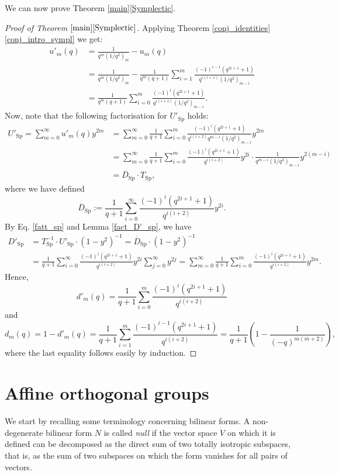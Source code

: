 \documentclass[a4paper, 12pt, oneside]{amsart}
\theoremstyle{definition}
\DeclareMathOperator{\Sp}{Sp}
\begin{document}
We can now prove Theorem \ref{main}\eqref{Symplectic}.
\begin{proof}[Proof of Theorem $\ref{main}\eqref{Symplectic}$]
Applying Theorem \ref{conj_identities}\eqref{conj_intro_sympl} we get:
\begin{align*}
u'_m(q)& =\frac{1}{q^m(1/q^2)_m}-u_m(q) \\
& =\frac{1}{q^m(1/q^2)_m}-\frac{1}{q^m(q+1)}\sum_{i=1}^{m}\frac{(-1)^{i-1}(q^{2i+1}+1)}{q^{i(i+1)}(1/q^2)_{m-i}}\\
& = \frac{1}{q^m(q+1)}\sum_{i=0}^{m}\frac{(-1)^{i}(q^{2i+1}+1)}{q^{i(i+1)}(1/q^2)_{m-i}}.
\end{align*}
Now, note that the following factorisation for $U'_{\Sp}$ holds:
\begin{align}
    \nonumber U'_{\Sp}=\sum_{m=0}^{\infty}u'_m(q)y^{2m}&=\sum_{m=0}^{\infty}\frac{1}{q+1}\sum_{i=0}^{m}
    \frac{(-1)^{i}(q^{2i+1}+1)}{q^{i(i+2)}q^{m-i}(1/q^2)_{m-i}}
    y^{2m}\\
    \nonumber &=\sum_{m=0}^{\infty}\frac{1}{q+1}\sum_{i=0}^{m}\frac{(-1)^i(q^{2i+1}+1)}{q^{i(i+2)}}y^{2i}\cdot\frac{1}{q^{m-i}(1/q^2)_{m-i}}y^{2(m-i)}\\
    \label{fatt_sp}
&=\overline{D}_{\Sp}\cdot T_{ \Sp},
\end{align}
where we have defined
$$\overline{D}_{\Sp}:=\frac{1}{q+1}\sum_{i=0}^{\infty}\frac{(-1)^i(q^{2i+1}+1)}{q^{i(i+2)}}y^{2i}.$$
By Eq. \eqref{fatt_sp} and Lemma \ref{fact_D'_sp}, we have 
\begin{align*}
D'_{\Sp}&=T^{-1}_{\Sp}\cdot U'_{\Sp} \cdot (1-y^2)^{-1}= \overline{D}_{\Sp} \cdot (1-y^2)^{-1} \\
&=\frac{1}{q+1}\sum_{i=0}^{\infty}\frac{(-1)^i(q^{2i+1}+1)}{q^{i(i+2)}}y^{2i}\sum_{j=0}^{\infty}y^{2j}=\sum_{m=0}^{\infty}\frac{1}{q+1}\sum_{i=0}^{m}\frac{(-1)^i(q^{2i+1}+1)}{q^{i(i+2)}}y^{2m}.
\end{align*}
Hence,
$$d'_m(q)=\frac{1}{q+1}\sum_{i=0}^{m}\frac{(-1)^i(q^{2i+1}+1)}{q^{i(i+2)}}$$
and
$$d_m(q)=1-d'_m(q)=\frac{1}{q+1}\sum_{i=1}^{m}\frac{(-1)^{i-1}(q^{2i+1}+1)}{q^{i(i+2)}}=\frac{1}{q+1}\left(1-\frac{1}{(-q)^{m(m+2)}}\right),$$
where the last equality follows easily by induction.
\end{proof}

\section{Affine orthogonal groups}
\label{sec_orthogonal}
We start by recalling some terminology concerning bilinear forms. A non-degenerate bilinear form $N$ is called \textit{null} if the vector space $V$ on which it is defined can be decomposed as the direct sum of two totally isotropic subspaces, that is, as the sum of two subspaces on which the form vanishes for all pairs of vectors.
\end{document}
